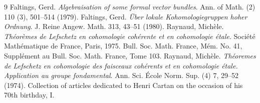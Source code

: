 \begin{thebibliography}{9}
Faltings, Gerd.
\newblock \emph{Algebraisation of some formal vector bundles}.
\newblock Ann. of Math. (2) 110 (3), 501--514 (1979).
Faltings, Gerd.
\newblock \emph{\"Uber lokale {K}ohomologiegruppen hoher {O}rdnung}.
\newblock J. Reine Angew. Math. 313, 43--51 (1980).
Raynaud, Mich\`ele.
\newblock \emph{Th\'eor\`emes de {L}efschetz en cohomologie coh\'erente et en cohomologie \'etale}.
\newblock Soci\'et\'e Math\'ematique de France, Paris, 1975.
\newblock Bull. Soc. Math. France, M\'em. No. 41, Suppl\'ement au Bull. Soc. Math. France, Tome 103.
Raynaud, Mich\`ele.
\newblock \emph{Th\'eoremes de {L}efschetz en cohomologie des faisceaux coh\'erents et en cohomologie \'etale. {A}pplication au groupe fondamental}.
\newblock Ann. Sci. \'Ecole Norm. Sup. (4) 7, 29--52 (1974).
\newblock Collection of articles dedicated to Henri Cartan on the occasion of his 70th birthday, I.
\end{thebibliography}
